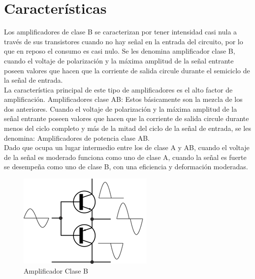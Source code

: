\documentclass[12pt,a4paper]{article}
\begin{document}
\section{Características}
Los amplificadores de clase B se caracterizan por tener intensidad casi nula a través de sus transistores cuando no hay señal en la entrada del circuito, por lo que en reposo el consumo es casi nulo. Se les denomina amplificador clase B, cuando el voltaje de polarización y la máxima amplitud de la señal entrante poseen valores que hacen que la corriente de salida circule durante el semiciclo de la señal de entrada.\\
La característica principal de este tipo de amplificadores es el alto factor de amplificación.
Amplificadores clase AB: Estos básicamente son la mezcla de los dos anteriores. Cuando el voltaje de polarización y la máxima amplitud de la señal entrante poseen valores que hacen que la corriente de salida circule durante menos del ciclo completo y más de la mitad del ciclo de la señal de entrada, se les denomina: Amplificadores de potencia clase AB.\\
Dado que ocupa un lugar intermedio entre los de clase A y AB, cuando el voltaje de la señal es moderado funciona como uno de clase A, cuando la señal es fuerte se desempeña como uno de clase B, con una eficiencia y deformación moderadas.\\
\begin{figure}[hbtp]
\centering
\includegraphics[scale=0.6]{Pictures/ClaseB.png}
\caption{Amplificador Clase B}
\end{figure}
\end{document}
